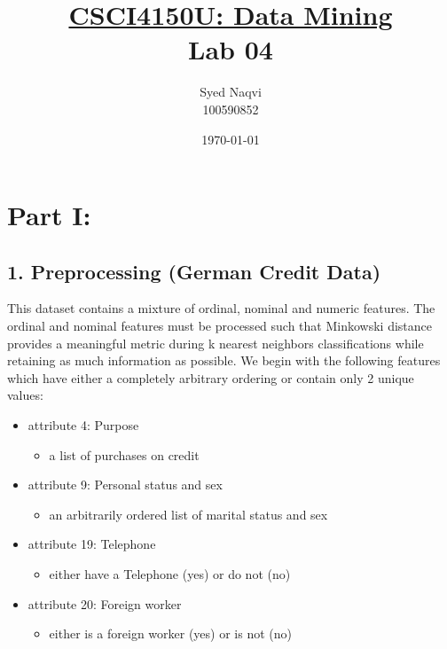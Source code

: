 \documentclass{article}
\title{\textbf{\underline{CSCI4150U: Data Mining}\\Lab 04}}
\author{Syed Naqvi\\100590852}
\date{\today}
\begin{document}
    \maketitle
    
    \section*{Part I:}

    \subsection*{1. Preprocessing (German Credit Data)}
    
    This dataset contains a mixture of ordinal, nominal and numeric features. The ordinal and nominal
    features must be processed such that Minkowski distance provides a meaningful metric
    during k nearest neighbors classifications while retaining as much information as possible.
    We begin with the following features which have either a completely arbitrary ordering or
    contain only 2 unique values:

    \begin{itemize}
        \item attribute 4: Purpose
        \begin{itemize}
            \item a list of purchases on credit
        \end{itemize}
        \item attribute 9: Personal status and sex
        \begin{itemize}
            \item an arbitrarily ordered list of marital status and sex
        \end{itemize}
        \item attribute 19: Telephone
        \begin{itemize}
            \item either have a Telephone (yes) or do not (no)
        \end{itemize}
        \item attribute 20: Foreign worker
        \begin{itemize}
            \item either is a foreign worker (yes) or is not (no)
        \end{itemize}
    \end{itemize}
    
    \newpage
\end{document}
